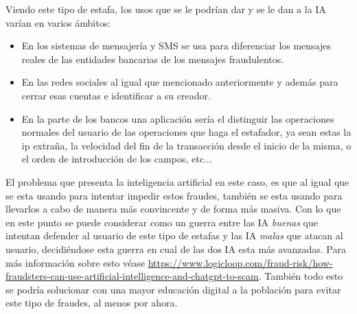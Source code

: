 \documentclass[12pt, a4paper]{report}
\begin{document}
Viendo este tipo de estafa, los usos que se le podrían dar y se le dan a la IA varían en varios ámbitos:
\begin{itemize}
	\item En los sistemas de mensajería y SMS se usa para diferenciar los mensajes reales de las entidades bancarias de los mensajes fraudulentos.
	\item En las redes sociales al igual que mencionado anteriormente y además para cerrar esas cuentas e identificar a su creador.
	\item En la parte de los bancos una aplicación sería el distinguir las operaciones normales del usuario de las operaciones que haga el estafador, ya sean estas la ip extraña, la velocidad del fin de la transacción desde el inicio de la misma, o el orden de introducción de los campos, etc...
\end{itemize}

El problema que presenta la inteligencia artificial en este caso, es que al igual que se esta usando para intentar impedir estos fraudes, también se esta usando para llevarlos a cabo de manera más convincente y de forma más masiva. Con lo que en este punto se puede considerar como un guerra entre las IA \textit{buenas} que intentan defender al usuario de este tipo de estafas y las IA \textit{malas} que atacan al usuario, decidiéndose esta guerra en cual de las dos IA esta más avanzadas. Para más información sobre esto véase \url{https://www.logicloop.com/fraud-risk/how-fraudsters-can-use-artificial-intelligence-and-chatgpt-to-scam}.
\newline
\newline
También todo esto se podría solucionar con una mayor educación digital a la población para evitar este tipo de fraudes, al menos por ahora.
\end{document}

